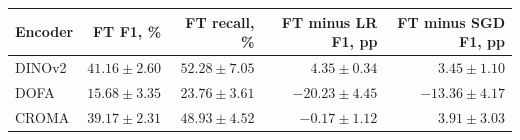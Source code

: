 \begin{tabular}{lrrrr}
\toprule
Encoder & FT F1, \% & FT recall, \% & FT minus LR F1, pp & FT minus SGD F1, pp \\
\midrule
DINOv2 & $41.16 \pm 2.60$ & $52.28 \pm 7.05$ & $4.35 \pm 0.34$ & $3.45 \pm 1.10$ \\
DOFA & $15.68 \pm 3.35$ & $23.76 \pm 3.61$ & $-20.23 \pm 4.45$ & $-13.36 \pm 4.17$ \\
CROMA & $39.17 \pm 2.31$ & $48.93 \pm 4.52$ & $-0.17 \pm 1.12$ & $3.91 \pm 3.03$ \\
\bottomrule
\end{tabular}
